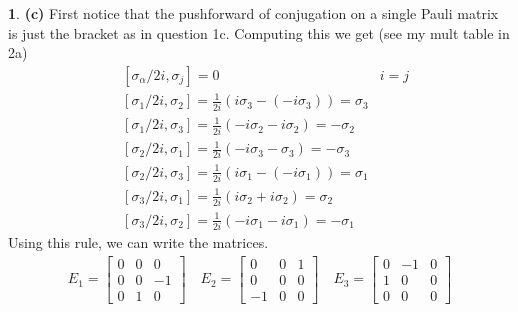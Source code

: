 \documentclass[10.5pt]{article}
\theoremstyle{definition}
\newtheorem{pb}{}
\begin{document}
\begin{pb}
        \textbf{(c)} First notice that the pushforward of conjugation on a single Pauli matrix is just the bracket as in question 1c. Computing this we get (see my mult table in 2a)
        \begin{align*}
            &[\sigma_\alpha/2i,\sigma_j] = 0 &i=j \\
            &[\sigma_1/2i,\sigma_2] = \frac{1}{2i}(i\sigma_3 - (-i\sigma_3)) = \sigma_3 \\
            &[\sigma_1/2i,\sigma_3] = \frac{1}{2i}(-i\sigma_2 - i\sigma_2) = -\sigma_2 \\
            &[\sigma_2/2i,\sigma_1] = \frac{1}{2i}(-i \sigma_3 - \sigma_3) = -\sigma_3 \\
            &[\sigma_2/2i,\sigma_3] = \frac{1}{2i}(i \sigma_1 - (-i\sigma_1)) = \sigma_1 \\
            &[\sigma_3/2i,\sigma_1] = \frac{1}{2i}(i\sigma_2 + i\sigma_2) = \sigma_2 \\
            &[\sigma_3/2i,\sigma_2] = \frac{1}{2i}(-i \sigma_1 - i \sigma_1) = -\sigma_1
        \end{align*}
        Using this rule, we can write the matrices.
        \begin{align*}
            E_1 = \begin{bmatrix} 0 & 0 & 0 \\ 0 & 0 & -1 \\ 0 & 1 & 0 \end{bmatrix} \quad E_2 = \begin{bmatrix} 0 & 0 & 1 \\ 0 & 0 & 0 \\ -1 & 0 & 0 \end{bmatrix} \quad 
            E_3 = \begin{bmatrix} 0 & -1 & 0 \\ 1 & 0 & 0 \\ 0 & 0 & 0 \end{bmatrix}
        \end{align*}


\end{pb}
\end{document}
